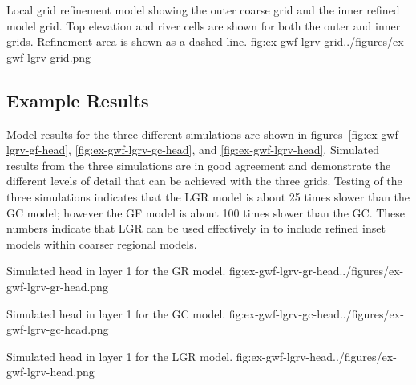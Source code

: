 \begin{StandardFigure}{
                                     Local grid refinement model showing the outer coarse grid and the inner refined model grid.  Top elevation and river cells are shown for both the outer and inner grids.  Refinement area is shown as a dashed line.
                                     }{fig:ex-gwf-lgrv-grid}{../figures/ex-gwf-lgrv-grid.png}
\end{StandardFigure}                                 

\subsection{Example Results}

Model results for the three different simulations are shown in figures~\ref{fig:ex-gwf-lgrv-gf-head}, \ref{fig:ex-gwf-lgrv-gc-head}, and \ref{fig:ex-gwf-lgrv-head}.  Simulated results from the three simulations are in good agreement and demonstrate the different levels of detail that can be achieved with the three grids.  Testing of the three simulations indicates that the LGR model is about 25 times slower than the GC model; however the GF model is about 100 times slower than the GC.  These numbers indicate that LGR can be used effectively in \mf to include refined inset models within coarser regional models.

\begin{StandardFigure}{
                                     Simulated head in layer 1 for the GR model.
                                     }{fig:ex-gwf-lgrv-gr-head}{../figures/ex-gwf-lgrv-gr-head.png}
\end{StandardFigure}                                 

\begin{StandardFigure}{
                                     Simulated head in layer 1 for the GC model.
                                     }{fig:ex-gwf-lgrv-gc-head}{../figures/ex-gwf-lgrv-gc-head.png}
\end{StandardFigure}                                 

\begin{StandardFigure}{
                                     Simulated head in layer 1 for the LGR model.
                                     }{fig:ex-gwf-lgrv-head}{../figures/ex-gwf-lgrv-head.png}
\end{StandardFigure}                                 

